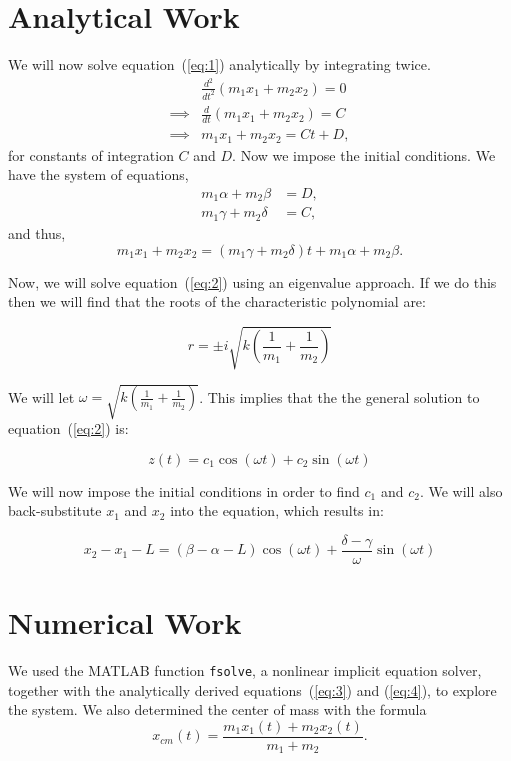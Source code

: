 \documentclass[11pt, oneside]{article}   	%
\begin{document}
\section{Analytical Work}
We will now solve equation~(\ref{eq:1})  analytically by integrating twice.
\begin{align*}
&\frac{d^2}{dt^2}(m_1x_1 + m_2x_2) = 0 \\
\implies & \frac{d}{dt}(m_1x_1 + m_2x_2) = C\\
\implies & m_1x_1 + m_2x_2 = Ct+D,
\end{align*}
for constants of integration $C$ and $D$. Now we impose the initial conditions.
We have the system of equations,
\begin{align*}
m_1\alpha + m_2\beta &= D, \\
m_1\gamma + m_2\delta &= C,
\end{align*}
and thus,
\begin{equation}
\label{eq:3}
m_1x_1 + m_2x_2 = (m_1\gamma + m_2\delta)t + m_1\alpha + m_2\beta.
\end{equation}

Now, we will solve equation~(\ref{eq:2}) using an eigenvalue approach.
If we do this then we will find that the roots of the characteristic polynomial are:

$$r = \pm i\sqrt{k\left(\frac{1}{m_1}+\frac{1}{m_2}\right)}$$

We will let $\displaystyle{\omega = \sqrt{k\left(\frac{1}{m_1}+\frac{1}{m_2}\right)}}$. This implies that the the general solution to equation~(\ref{eq:2}) is:

$$z(t) = c_1\cos{(\omega t)}+c_2\sin{(\omega t)}$$

We will now impose the initial conditions in order to find $c_1$ and $c_2$.
We will also back-substitute $x_1$ and $x_2$ into the equation, which results in:

\begin{equation}
\label{eq:4}
x_2-x_1-L = \left(\beta - \alpha - L\right)\cos{\left(\omega t\right)}+\frac{\delta - \gamma}{\omega}\sin{(\omega t)}
\end{equation}

\section{Numerical Work}
We used the MATLAB function \texttt{fsolve}, a nonlinear implicit equation solver, together with the analytically derived equations~(\ref{eq:3}) and (\ref{eq:4}), to explore the system.
We also determined the center of mass with the formula
$$
x_{cm}(t) = \frac{m_1x_1(t) + m_2x_2(t)}{m_1 + m_2}.
$$
\end{document}
